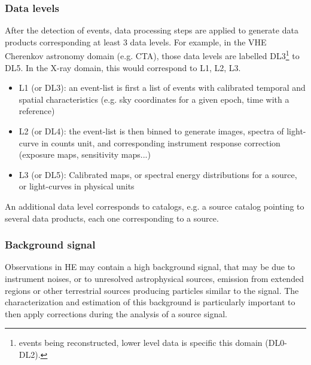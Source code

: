 \documentclass[11pt,a4paper]{ivoa}
\begin{document}



\subsubsection{Data levels}

After the detection of events, data processing steps are applied to generate data products corresponding at least 3 data levels.
For example, in the VHE Cherenkov astronomy domain (e.g. CTA), those data levels are labelled DL3\footnote{events being reconstructed, lower level data is specific this domain (DL0-DL2).} to DL5. In the X-ray domain, this would correspond to L1, L2, L3.

\begin{itemize}
    \item L1 (or DL3): an event-list is first a list of events with calibrated temporal and spatial characteristics (e.g. sky coordinates for a given epoch, time with a reference)
    \item L2 (or DL4): the event-list is then binned to generate images, spectra of light-curve in counts unit, and corresponding instrument response correction (exposure maps, sensitivity maps...)
    \item L3 (or DL5): Calibrated maps, or spectral energy distributions for a source, or light-curves in physical units
\end{itemize}

An additional data level corresponds to catalogs, e.g. a source catalog pointing to several data products, each one corresponding to a source.


\subsubsection{Background signal}

Observations in HE may contain a high background signal, that may be due to instrument noises, or to unresolved astrophysical sources, emission from extended regions or other terrestrial sources producing particles similar to the signal. The characterization and estimation of this background is particularly important to then apply corrections during the analysis of a source signal.
\end{document}
